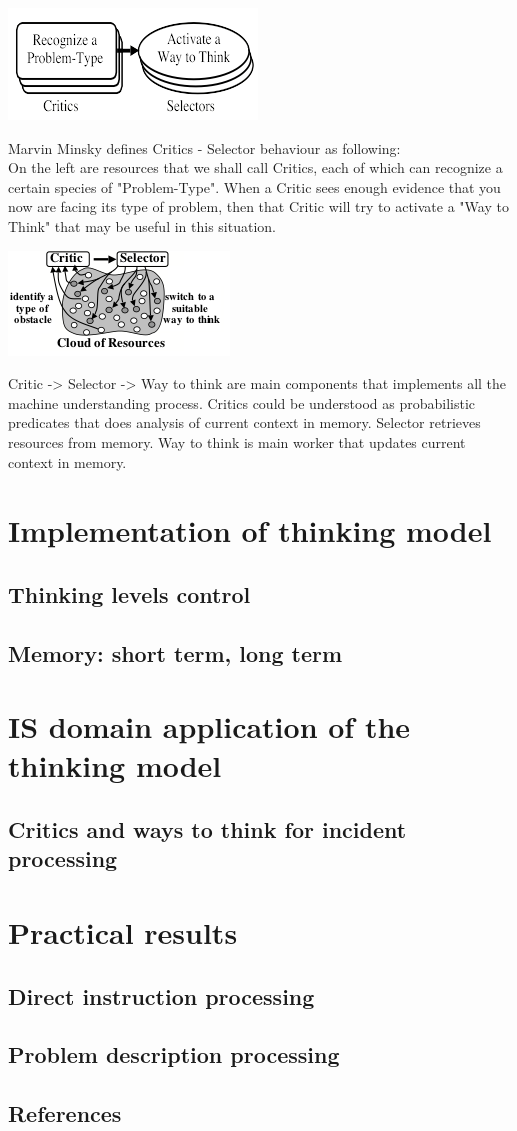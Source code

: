 \documentclass{acm_proc_article-sp}
\begin{document}
\includegraphics{critic_selector_model.png}


Marvin Minsky defines Critics - Selector behaviour as following:\\
On the left are resources that we shall call Critics, each of which can recognize a certain species of "Problem-Type". When a Critic sees enough evidence that you now are facing its type of problem, then that Critic will try to activate a "Way to Think" that may be useful in this situation.

\includegraphics{critic_selector.png}

Critic -> Selector -> Way to think are main components that implements all the machine understanding process. Critics could be understood as probabilistic predicates that does analysis of current context in memory. Selector retrieves resources from memory. Way to think is main worker that updates current context in memory.

\section{Implementation of thinking model}
\subsection{Thinking levels control}
\subsection{Memory: short term, long term}


\section{IS domain application of the thinking model}
\subsection{Critics and ways to think for incident processing}

\section{Practical results}
\subsection{Direct instruction processing}
\subsection{Problem description processing}


\subsection{References}
\end{document}
